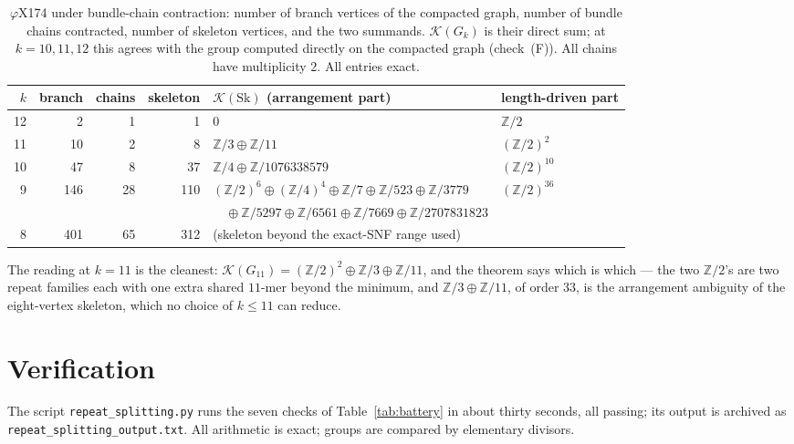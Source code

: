 \documentclass[11pt]{article}
\theoremstyle{plain}
\theoremstyle{definition}
\theoremstyle{remark}
\newcommand{\Z}{\mathbb{Z}}
\newcommand{\K}{\mathcal{K}}
\newcommand{\Sk}{\mathrm{Sk}}
\begin{document}
\begin{table}[ht]
\centering\footnotesize
\begin{tabular}{rrrrll}
\toprule
$k$ & branch & chains & skeleton & $\K(\Sk)$ (arrangement part) & length-driven part\\
\midrule
12 &   2 &  1 &   1 & $0$ & $\Z/2$\\
11 &  10 &  2 &   8 & $\Z/3\oplus\Z/11$ & $(\Z/2)^{2}$\\
10 &  47 &  8 &  37 & $\Z/4\oplus\Z/1076338579$ & $(\Z/2)^{10}$\\
 9 & 146 & 28 & 110 & $(\Z/2)^{6}\oplus(\Z/4)^{4}\oplus\Z/7\oplus\Z/523\oplus\Z/3779$ & $(\Z/2)^{36}$\\
   &     &    &     & $\quad\oplus\Z/5297\oplus\Z/6561\oplus\Z/7669\oplus\Z/2707831823$ & \\
 8 & 401 & 65 & 312 & (skeleton beyond the exact-SNF range used) & \\
\bottomrule
\end{tabular}
\caption{$\varphi$X174 under bundle-chain contraction: number of branch vertices of the
compacted graph, number of bundle chains contracted, number of skeleton vertices, and the
two summands. $\K(G_k)$ is their direct sum; at $k=10,11,12$ this agrees with the group
computed directly on the compacted graph (check~(F)). All chains have multiplicity $2$.
All entries exact.}
\label{tab:phix}
\end{table}

The reading at $k=11$ is the cleanest: $\K(G_{11})=(\Z/2)^{2}\oplus\Z/3\oplus\Z/11$, and
the theorem says which is which --- the two $\Z/2$'s are two repeat families each with one
extra shared $11$-mer beyond the minimum, and $\Z/3\oplus\Z/11$, of order $33$, is the
arrangement ambiguity of the eight-vertex skeleton, which no choice of $k\le11$ can
reduce.

\section{Verification}\label{sec:battery}

The script \texttt{repeat\_splitting.py} runs the seven checks of Table~\ref{tab:battery}
in about thirty seconds, all passing; its output is archived as
\texttt{repeat\_splitting\_output.txt}. All arithmetic is exact; groups are compared by
elementary divisors.
\end{document}
